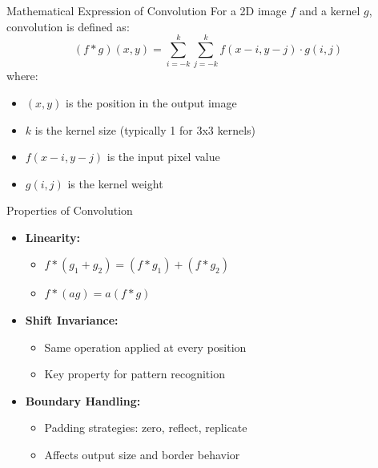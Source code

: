 \documentclass{beamer}
\begin{document}
\begin{frame}{Mathematical Expression of Convolution}
  For a 2D image \(f\) and a kernel \(g\), convolution is defined as:
  \[
    (f * g)(x,y) = \sum_{i=-k}^{k} \sum_{j=-k}^{k} f(x-i, y-j) \cdot g(i,j)
  \]
  where:
  \begin{itemize}
    \item \((x,y)\) is the position in the output image
    \item \(k\) is the kernel size (typically 1 for 3x3 kernels)
    \item \(f(x-i, y-j)\) is the input pixel value
    \item \(g(i,j)\) is the kernel weight
  \end{itemize}
\end{frame}

\begin{frame}{Properties of Convolution}
  \begin{itemize}
    \item \textbf{Linearity:}
      \begin{itemize}
        \item \(f * (g_1 + g_2) = (f * g_1) + (f * g_2)\)
        \item \(f * (ag) = a(f * g)\)
      \end{itemize}
    \item \textbf{Shift Invariance:}
      \begin{itemize}
        \item Same operation applied at every position
        \item Key property for pattern recognition
      \end{itemize}
    \item \textbf{Boundary Handling:}
      \begin{itemize}
        \item Padding strategies: zero, reflect, replicate
        \item Affects output size and border behavior
      \end{itemize}
  \end{itemize}
\end{frame}
\end{document}
